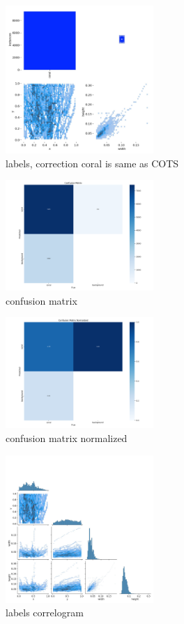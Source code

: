 \documentclass[conference]{IEEEtran}
\begin{document}
\begin{figure}[H]
    \centering
    \includegraphics[width=0.5\textwidth]{labels.jpg} 
    \caption{labels, correction coral is same as COTS}
    \label{fig:metadata-schema}
\end{figure}
\begin{figure}[H]
    \centering
    \includegraphics[width=0.5\textwidth]{confusion_matrix.png} 
    \caption{confusion matrix}
    \label{fig:metadata-schema}
\end{figure}
\begin{figure}[H]
    \centering
    \includegraphics[width=0.5\textwidth]{confusion_matrix_normalized.png} 
    \caption{confusion matrix normalized}
    \label{fig:metadata-schema}
\end{figure}
\begin{figure}[H]
    \centering
    \includegraphics[width=0.5\textwidth]{labels_correlogram.jpg} 
    \caption{labels correlogram}
    \label{fig:metadata-schema}
\end{figure}
\end{document}
